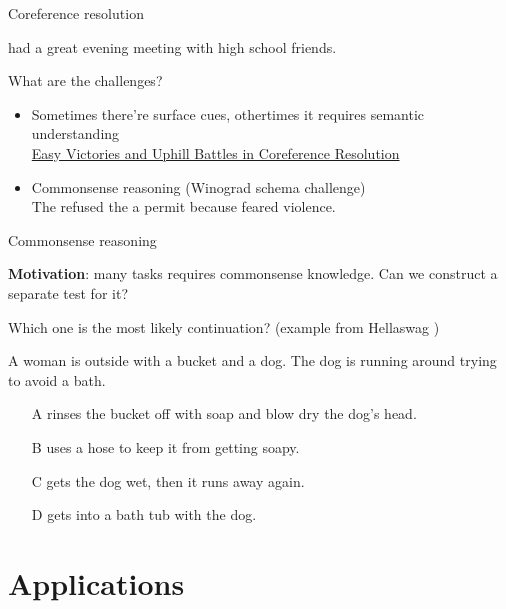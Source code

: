 \documentclass[usenames,dvipsnames,notes,11pt,aspectratio=169,hyperref={colorlinks=true, linkcolor=blue}]{beamer}
\newcommand{\pdfnote}[1]{}
\begin{document}
\begin{frame}
    {Coreference resolution}

     had a great evening meeting with  high school friends.\par

    What are the challenges?\\\pause
    \begin{itemize}
        \item Sometimes there're surface cues, othertimes it requires semantic understanding\\
            \href{https://nlp.cs.berkeley.edu/pubs/Durrett-Klein_2013_Coreference_paper.pdf}{Easy Victories and Uphill Battles in Coreference Resolution} 
        \item Commonsense reasoning (Winograd schema challenge)\\\medskip
            The  refused the  a permit because  feared violence.\par
    \end{itemize}
\end{frame}

\begin{frame}
    {Commonsense reasoning}

    \textbf{Motivation}: many tasks requires commonsense knowledge. Can we construct a separate test for it?\pause

    \bigskip
    Which one is the most likely continuation? (example from Hellaswag )

    A woman is outside with a bucket and a dog. The dog is running around trying to avoid a bath.\\
    \begin{itemize}
        \item[A] rinses the bucket off with soap and blow dry the dog’s head.
        \item[B] uses a hose to keep it from getting soapy.
        \item[C] gets the dog wet, then it runs away again.
        \item[D] gets into a bath tub with the dog.
    \end{itemize}
    \pdfnote{C}
\end{frame}

\section{Applications}
\end{document}

